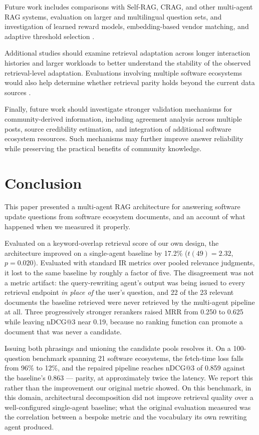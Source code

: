\documentclass[acmsmall,review,anonymous,screen]{acmart}
\begin{document}
Future work includes comparisons with Self-RAG, CRAG, and other
multi-agent RAG systems, evaluation on larger and multilingual
question sets, and investigation of learned reward models,
embedding-based vendor matching, and adaptive threshold selection \cite{asai2024selfrag,yang2024,ranaldi2025}.

Additional studies should examine retrieval adaptation across longer
interaction histories and larger workloads to better understand the
stability of the observed retrieval-level adaptation. Evaluations involving
multiple software ecosystems would also help determine whether retrieval parity
holds beyond the current data sources \cite{reuter2025}.

Finally, future work should investigate stronger validation mechanisms
for community-derived information, including agreement analysis across
multiple posts, source credibility estimation, and integration of
additional software ecosystem resources. Such mechanisms may further
improve answer reliability while preserving the practical benefits of
community knowledge.

\section{Conclusion}\label{sec:conclusion}

This paper presented a multi-agent RAG architecture for answering software
update questions from software ecosystem documents, and an account of what
happened when we measured it properly.

Evaluated on a keyword-overlap retrieval score of our own design, the
architecture improved on a single-agent baseline by 17.2\% ($t(49)=2.32$,
$p=0.020$). Evaluated with standard IR metrics over pooled relevance judgments,
it lost to the same baseline by roughly a factor of five. The disagreement was
not a metric artifact: the query-rewriting agent's output was being issued to
every retrieval endpoint \emph{in place of} the user's question, and 22 of the
23 relevant documents the baseline retrieved were never retrieved by the
multi-agent pipeline at all. Three progressively stronger rerankers raised MRR
from 0.250 to 0.625 while leaving nDCG@3 near 0.19, because no ranking function
can promote a document that was never a candidate.

Issuing both phrasings and unioning the candidate pools resolves it. On a
100-question benchmark spanning 21 software ecosystems, the fetch-time loss
falls from 96\% to 12\%, and the repaired pipeline reaches nDCG@3 of 0.859
against the baseline's 0.863 --- parity, at approximately twice the latency. We report this rather than the
improvement our original metric showed. On this benchmark, in this domain,
architectural decomposition did not improve retrieval quality over a
well-configured single-agent baseline; what the original evaluation measured was
the correlation between a bespoke metric and the vocabulary its own rewriting
agent produced.
\end{document}
